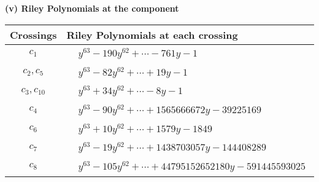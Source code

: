 \documentclass[1p]{elsarticle_modified}
\theoremstyle{definition}
\begin{document}
\newpage\renewcommand{\arraystretch}{1}
\flushleft \textbf{(v) Riley Polynomials at the component}\newline \\
\begin{tabular}{m{50pt}|m{274pt}}
Crossings & \hspace{64pt}Riley Polynomials at each crossing \\
\hline $$\begin{aligned}c_{1}\end{aligned}$$&$\begin{aligned}
&y^{63}-190 y^{62}+\cdots-761 y-1
\end{aligned}$\\
\hline $$\begin{aligned}c_{2},c_{5}\end{aligned}$$&$\begin{aligned}
&y^{63}-82 y^{62}+\cdots+19 y-1
\end{aligned}$\\
\hline $$\begin{aligned}c_{3},c_{10}\end{aligned}$$&$\begin{aligned}
&y^{63}+34 y^{62}+\cdots-8 y-1
\end{aligned}$\\
\hline $$\begin{aligned}c_{4}\end{aligned}$$&$\begin{aligned}
&y^{63}-90 y^{62}+\cdots+1565666672 y-39225169
\end{aligned}$\\
\hline $$\begin{aligned}c_{6}\end{aligned}$$&$\begin{aligned}
&y^{63}+10 y^{62}+\cdots+1579 y-1849
\end{aligned}$\\
\hline $$\begin{aligned}c_{7}\end{aligned}$$&$\begin{aligned}
&y^{63}-19 y^{62}+\cdots+1438703057 y-144408289
\end{aligned}$\\
\hline $$\begin{aligned}c_{8}\end{aligned}$$&$\begin{aligned}
&y^{63}-105 y^{62}+\cdots+44795152652180 y-591445593025
\end{aligned}$\\

\end{tabular}
\end{document}
